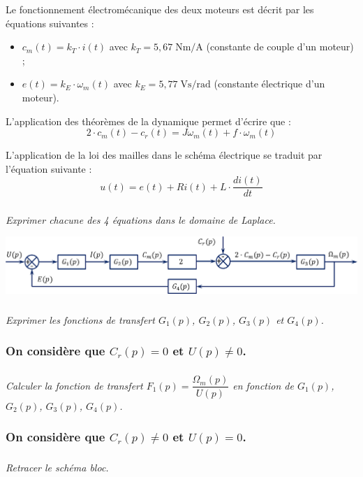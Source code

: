 \documentclass[10pt]{article}
\newif\ifprof
\begin{document}
\vspace{.25cm}
Le fonctionnement électromécanique des deux moteurs est décrit par les équations suivantes :
\begin{itemize}
\item $c_m (t)=k_T \cdot i(t)$ avec $k_T=5,67 \;\text{Nm/A}$ (constante de couple d’un moteur) ;
\item $e(t)=k_E \cdot \omega_m (t)$ avec $k_E=5,77 \; \text{Vs/rad}$ (constante électrique d’un moteur).
\end{itemize}

L’application des théorèmes de la dynamique permet d’écrire que : 
$$ 2\cdot c_m (t)-c_r (t)=J\omega_m (t)+f\cdot \omega_m (t)$$

L’application de la loi des mailles dans le schéma électrique se traduit par l’équation suivante :
$$u(t)=e(t)+Ri(t)+L \cdot \dfrac{di(t)}{dt}$$


\subparagraph{}
\textit{Exprimer chacune des 4 équations dans le domaine de Laplace.}
\ifprof
\begin{corrige}
\end{corrige}
\else
\fi

\begin{center}
\includegraphics[width=.9\textwidth]{images/SchemaBloc_01}
\end{center}

\subparagraph{}
\textit{Exprimer les fonctions de transfert $G_1(p)$, $G_2(p)$, $G_3(p)$ et $G_4(p)$.}
\ifprof
\begin{corrige}
\end{corrige}
\else
\fi


\subsubsection*{On considère que $C_r (p)=0$ et $U(p)\neq 0$.}

\subparagraph{}\textit{Calculer la fonction de transfert $F_1 (p)=\dfrac{\Omega_m (p)}{U(p)}$ en fonction de $G_1(p)$, $G_2(p)$, $G_3(p)$, $G_4 (p)$.}
\ifprof
\begin{corrige}
\end{corrige}
\else
\fi

\subsubsection*{On considère que $C_r (p)\neq0$ et $U(p)=0$.}
\subparagraph{}
\textit{Retracer le schéma bloc.}
\ifprof
\begin{corrige}
\end{corrige}
\else
\fi
\end{document}
